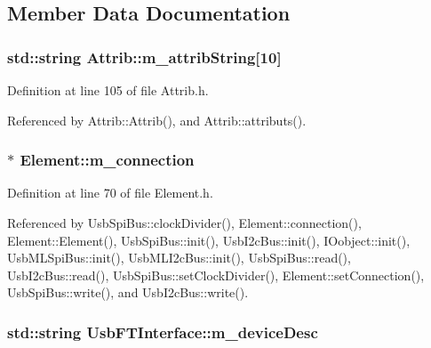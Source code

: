 \subsection{Member Data Documentation}
\hypertarget{classAttrib_a3414521d7a82476e874b25a5407b5e63}{
\subsubsection[{m\_\-attribString}]{\setlength{\rightskip}{0pt plus 5cm}std::string {\bf Attrib::m\_\-attribString}\mbox{[}10\mbox{]}}}
\label{classAttrib_a3414521d7a82476e874b25a5407b5e63}


Definition at line 105 of file Attrib.h.

Referenced by Attrib::Attrib(), and Attrib::attributs().\hypertarget{classElement_abe3de7a5dbbc9a6dd2d7e012e5fdb266}{
\subsubsection[{m\_\-connection}]{$\ast$ {\bf Element::m\_\-connection}}}
\label{classElement_abe3de7a5dbbc9a6dd2d7e012e5fdb266}


Definition at line 70 of file Element.h.

Referenced by UsbSpiBus::clockDivider(), Element::connection(), Element::Element(), UsbSpiBus::init(), UsbI2cBus::init(), IOobject::init(), UsbMLSpiBus::init(), UsbMLI2cBus::init(), UsbSpiBus::read(), UsbI2cBus::read(), UsbSpiBus::setClockDivider(), Element::setConnection(), UsbSpiBus::write(), and UsbI2cBus::write().\hypertarget{classUsbFTInterface_a500067688c32cdb3719fecf128e88dca}{
\subsubsection[{m\_\-deviceDesc}]{\setlength{\rightskip}{0pt plus 5cm}std::string {\bf UsbFTInterface::m\_\-deviceDesc}}}
\label{classUsbFTInterface_a500067688c32cdb3719fecf128e88dca}


